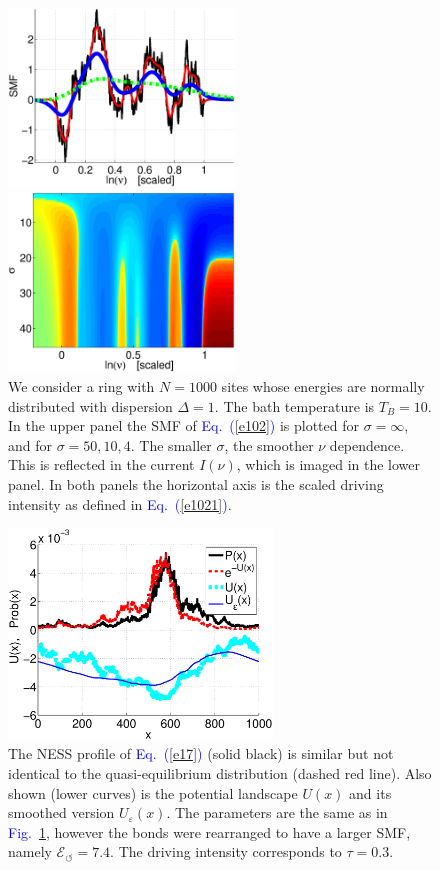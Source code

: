 \documentclass[aps,prl,floats,floatfix,twocolumn]{revtex4}
\newcommand{\Eq}[1]{\textcolor{blue}{Eq.\!\!~(\ref{#1})}}
\newcommand{\Fig}[1]{\textcolor{blue}{Fig.}\!\!~\ref{#1}}
\begin{document}
\begin{figure}
\includegraphics[width=6cm]{SMF_RW.eps}

\vspace*{5mm}

\includegraphics[width=6cm]{I_sig_tau.eps}

\caption{
We consider a ring with ${N=1000}$ sites whose energies 
are normally distributed with dispersion ${\Delta=1}$.
The bath temperature is $T_B=10$. In the upper panel 
the SMF of \Eq{e102} is plotted for $\sigma=\infty$, 
and for $\sigma=50,10,4$. The smaller $\sigma$, 
the smoother $\nu$ dependence. 
This is reflected in the current $I(\nu)$, which is 
imaged in the lower panel.  
In both panels the horizontal axis is 
the scaled driving intensity as defined in \Eq{e1021}.} 
\label{f2}
\end{figure}



\begin{figure}
\includegraphics[width=7cm]{PvsV4}

\caption{
The NESS profile of \Eq{e17} (solid black) 
is similar but not identical to the quasi-equilibrium 
distribution (dashed red line). 
Also shown (lower curves) is the potential landscape $U(x)$ 
and its smoothed version $U_{\varepsilon}(x)$. 
The parameters are the same as in \Fig{f2}, 
however the bonds were rearranged to have a larger SMF,
namely $\mathcal{E}_{\circlearrowleft}=7.4$.
The driving intensity corresponds to $\tau=0.3$.}

\label{f3}
\end{figure}
\end{document}
